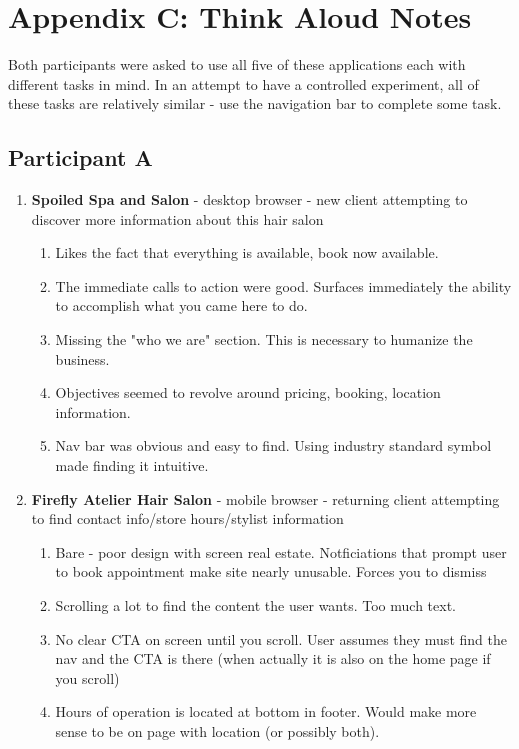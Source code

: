\section{Appendix C: Think Aloud Notes}
 Both participants were asked to use all five of these applications each with different tasks in mind. In an attempt to have a controlled experiment, all of these tasks are relatively similar - use the navigation bar to complete some task.

\subsection{Participant A}

\begin{enumerate}
\item
  \textbf{Spoiled Spa and Salon} - desktop browser - new client attempting to discover more information about this hair salon
  \begin{enumerate}
  \item
    Likes the fact that everything is available, book now available.
  \item
    The immediate calls to action were good. Surfaces immediately the ability to accomplish what you came here to do.
  \item
    Missing the "who we are" section. This is necessary to humanize the business.
  \item
    Objectives seemed to revolve around pricing, booking, location information.
  \item
    Nav bar was obvious and easy to find. Using industry standard symbol made finding it intuitive.
  \end{enumerate}
\item
  \textbf{Firefly Atelier Hair Salon} - mobile browser - returning client attempting to find contact info/store hours/stylist information
  \begin{enumerate}
  \item
    Bare - poor design with screen real estate. Notficiations that prompt user to book appointment make site nearly unusable. Forces you to dismiss
  \item
    Scrolling a lot to find the content the user wants. Too much text.
  \item
    No clear CTA on screen until you scroll. User assumes they must find the nav and the CTA is there (when actually it is also on the home page if you scroll)
  \item
    Hours of operation is located at bottom in footer. Would make more sense to be on page with location (or possibly both).

\end{enumerate}
\end{enumerate}
